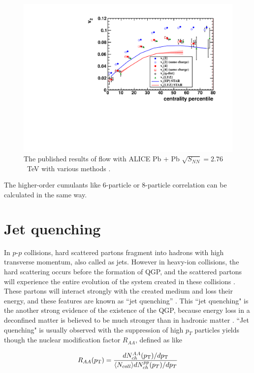 \begin{figure}[!h]
\centerline{\includegraphics[width=12.0cm]{figures/alice_flow_result}}
\caption{ The published results of flow with ALICE Pb + Pb $\sqrt{S_{NN}}=2.76$~TeV with various methods \cite{Aamodt:2010pa}.} 
\label{fig:alice_flow_result}
\end{figure}


The higher-order cumulants like 6-particle or 8-particle correlation can be calculated in the same way.

\section{Jet quenching}


In $p$-$p$ collisions, hard scattered partons fragment into hadrons with high transverse momentum, also called as jets. However in heavy-ion collisions, the hard scattering occurs before the formation of QGP, and the scattered partons will experience the entire evolution of the system created in these collisions \cite{Enterria:2009am}.
These partons will interact strongly with the created medium and loss their energy, and these features are known as ``jet quenching''  \cite{PhysRevLett.68.1480}. This ``jet quenching" is the another strong evidence of the existence of the QGP, because energy loss in a deconfined matter is believed to be much stronger than in hadronic matter \cite{PhysRevLett.68.1480}. ``Jet quenching" is usually observed with the suppression of high $p_T$ particles yields though the nuclear modification factor $R_{AA}$, defined as like 
 
 \begin{equation}
	R_{AA}(p_{\rm{T}}) = \frac{dN_{ch}^{AA}(p_{\rm{T}})/dp_{\rm{T}}}{\langle N_{coll} \rangle dN_{ch}^{pp}(p_T)/dp_T}
\end{equation}

